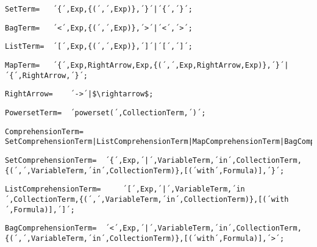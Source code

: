 \documentclass{article}
\begin{document}
    \begin{lstlisting}[mathescape=true]
     SetTerm= 	´{´,Exp,{(´,´,Exp)},´}´|´{´,´}´;
    \end{lstlisting}
    
    \begin{lstlisting}[mathescape=true]
     BagTerm= 	´<´,Exp,{(´,´,Exp)},´>´|´<´,´>´;
    \end{lstlisting}
    
    \begin{lstlisting}[mathescape=true]
     ListTerm= 	´[´,Exp,{(´,´,Exp)},´]´|´[´,´]´;
    \end{lstlisting}
    
    \begin{lstlisting}[mathescape=true]
     MapTerm= 	´{´,Exp,RightArrow,Exp,{(´,´,Exp,RightArrow,Exp)},´}´|´{´,RightArrow,´}´;
    \end{lstlisting}
    
    \begin{lstlisting}[mathescape=true]
     RightArrow= 	´->´|$\rightarrow$;
    \end{lstlisting}
    
    \begin{lstlisting}[mathescape=true]
     PowersetTerm= 	´powerset(´,CollectionTerm,´)´;
    \end{lstlisting}
    
    \begin{lstlisting}[mathescape=true]
     ComprehensionTerm= 	SetComprehensionTerm|ListComprehensionTerm|MapComprehensionTerm|BagComprehensionTerm|NumberRangeTerm;
    \end{lstlisting}
    
    \begin{lstlisting}[mathescape=true]
     SetComprehensionTerm= 	´{´,Exp,´|´,VariableTerm,´in´,CollectionTerm,{(´,´,VariableTerm,´in´,CollectionTerm)},[(´with´,Formula)],´}´;
    \end{lstlisting}
    
    \begin{lstlisting}[mathescape=true]
     ListComprehensionTerm= 	´[´,Exp,´|´,VariableTerm,´in´,CollectionTerm,{(´,´,VariableTerm,´in´,CollectionTerm)},[(´with´,Formula)],´]´;
    \end{lstlisting}
    
    \begin{lstlisting}[mathescape=true]
     BagComprehensionTerm= 	´<´,Exp,´|´,VariableTerm,´in´,CollectionTerm,{(´,´,VariableTerm,´in´,CollectionTerm)},[(´with´,Formula)],´>´;
    \end{lstlisting}
    
\end{document}
